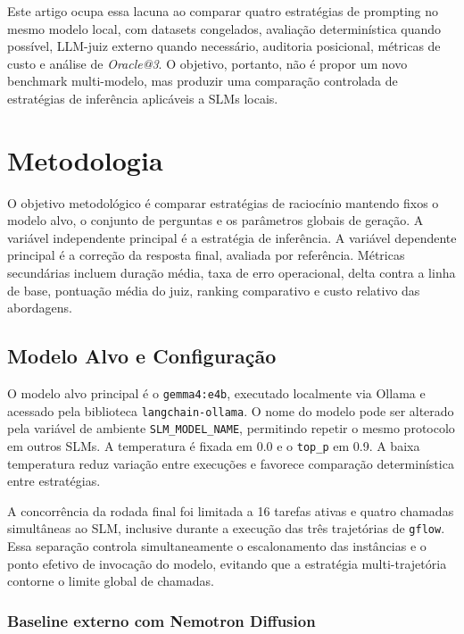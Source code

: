 \documentclass[12pt]{article}
\begin{document}
Este artigo ocupa essa lacuna ao comparar quatro estratégias de prompting no mesmo modelo local, com datasets congelados, avaliação determinística quando possível, LLM-juiz externo quando necessário, auditoria posicional, métricas de custo e análise de \textit{Oracle@3}. O objetivo, portanto, não é propor um novo benchmark multi-modelo, mas produzir uma comparação controlada de estratégias de inferência aplicáveis a SLMs locais.

\section{Metodologia}

O objetivo metodológico é comparar estratégias de raciocínio mantendo fixos o modelo alvo, o conjunto de perguntas e os parâmetros globais de geração. A variável independente principal é a estratégia de inferência. A variável dependente principal é a correção da resposta final, avaliada por referência. Métricas secundárias incluem duração média, taxa de erro operacional, delta contra a linha de base, pontuação média do juiz, ranking comparativo e custo relativo das abordagens.

\subsection{Modelo Alvo e Configuração}

O modelo alvo principal é o \texttt{gemma4:e4b}, executado localmente via Ollama e acessado pela biblioteca \texttt{langchain-ollama}. O nome do modelo pode ser alterado pela variável de ambiente \texttt{SLM\_MODEL\_NAME}, permitindo repetir o mesmo protocolo em outros SLMs. A temperatura é fixada em 0.0 e o \texttt{top\_p} em 0.9. A baixa temperatura reduz variação entre execuções e favorece comparação determinística entre estratégias.

A concorrência da rodada final foi limitada a 16 tarefas ativas e quatro chamadas simultâneas ao SLM, inclusive durante a execução das três trajetórias de \texttt{gflow}. Essa separação controla simultaneamente o escalonamento das instâncias e o ponto efetivo de invocação do modelo, evitando que a estratégia multi-trajetória contorne o limite global de chamadas.

\subsubsection{Baseline externo com Nemotron Diffusion}
\end{document}
